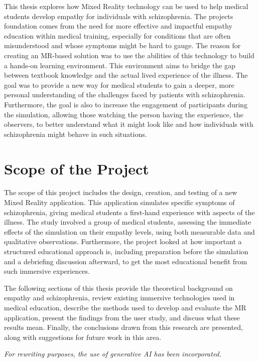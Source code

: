 \vspace{1em}

This thesis explores how Mixed Reality technology can be used to help medical students develop empathy for individuals with schizophrenia. The projects foundation comes from the need for more effective and impactful empathy education within medical training, especially for conditions that are often misunderstood and whose symptoms might be hard to gauge. The reason for creating an MR-based solution was to use the abilities of this technology to build a hands-on learning environment. This environment aims to bridge the gap between textbook knowledge and the actual lived experience of the illness. The goal was to provide a new way for medical students to gain a deeper, more personal understanding of the challenges faced by patients with schizophrenia. Furthermore, the goal is also to increase the engagement of participants during the simulation, allowing those watching the person having the experience, the observers, to better understand what it might look like and how individuals with schizophrenia might behave in such situations.

\section{Scope of the Project}

The scope of this project includes the design, creation, and testing of a new Mixed Reality application. This application simulates specific symptoms of schizophrenia, giving medical students a first-hand experience with aspects of the illness. The study involved a group of medical students, assessing the immediate effects of the simulation on their empathy levels, using both measurable data and qualitative observations. Furthermore, the project looked at how important a structured educational approach is, including preparation before the simulation and a debriefing discussion afterward, to get the most educational benefit from such immersive experiences. 

\vspace{1em}

The following sections of this thesis provide the theoretical background on empathy and schizophrenia, review existing immersive technologies used in medical education, describe the methods used to develop and evaluate the MR application, present the findings from the user study, and discuss what these results mean. Finally, the conclusions drawn from this research are presented, along with suggestions for future work in this area.

\bigskip
\noindent
\textit{For rewriting purposes, the use of generative AI has been incorporated.}
